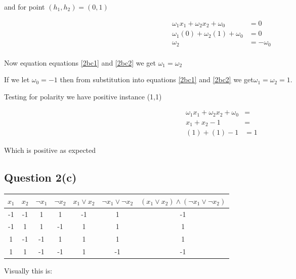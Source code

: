 \documentclass[10pt,a4paper]{article}
\begin{document}
and for point $(h_1,h_2) = (0,1)$

\begin{equation}
\label{2bc2}
\begin{split}
\omega_1 x_1 + \omega_2 x_2 + \omega_0 &= 0 \\
\omega_1(0) + \omega_2(1) + \omega_0 &= 0 \\
\omega_2 &= -\omega_0\\
\end{split}
\end{equation}

Now equation equations \ref{2bc1} and \ref{2bc2} we get $\omega_1 = \omega_2$

If we let $\omega_0 = -1$ then from substitution into equations \ref{2bc1} and \ref{2bc2} we get$\omega_1=\omega_2=1$.

Testing for polarity we have positive instance (1,1) 

\begin{equation}
\begin{split}
\omega_1 x_1 + \omega_2 x_2 + \omega_0 &= \\
x_1 + x_2 -1 &= \\
(1) + (1) - 1 &= 1
\end{split}
\end{equation}

Which is positive as expected














\subsection{Question 2(c)}

\begin{tabular}{|c|c|c|c|c|c|c|}
\hline
$x_1$ & $x_2$ & $\neg x_1$ & $\neg x_2$ & $x_1 \vee x_2$ & $\neg x_1 \vee \neg x_2$ & $(x_1 \vee x_2)\wedge (\neg x_1 \vee \neg x_2)$\\
\hline
-1 &-1 &1 &1 & -1& 1 & -1\\
-1 &1 &1 &-1 & 1& 1 & 1\\
1 &-1 &-1 &1 & 1& 1 & 1\\
1 &1 &-1 &-1 & 1& -1 & -1\\
\hline
\end{tabular}

Visually this is:
\end{document}
